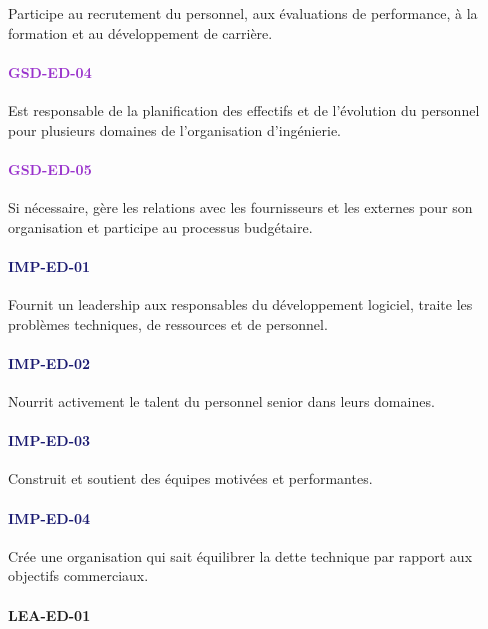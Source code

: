 \documentclass[a4paper, french, openany, 12pt]{book}
\newcommand\str[1]{\textcolor{DarkOrchid}{\textbf{\uppercase{gsd-{#1}}}}}
\newcommand\wis[1]{\textcolor{MidnightBlue}{\textbf{\uppercase{imp-{#1}}}}}
\newcommand\cha[1]{\textcolor{OliveGreen}{\textbf{\uppercase{lea-{#1}}}}}
\begin{document}
\begin{multicols}{2}
  Participe au recrutement du personnel, aux évaluations de performance, à la formation et au développement de carrière. 

  \paragraph*{\str{ed-04}}

  Est responsable de la planification des effectifs et de l'évolution du personnel pour plusieurs domaines de 
  l'organisation d'ingénierie.

  \paragraph*{\str{ed-05}}

  Si nécessaire, gère les relations avec les fournisseurs et les externes pour son organisation et participe au processus 
  budgétaire.

  \paragraph*{\wis{ed-01}}

  Fournit un leadership aux responsables du développement logiciel, traite les problèmes techniques, de ressources et de 
  personnel.

  \paragraph*{\wis{ed-02}}

  Nourrit activement le talent du personnel senior dans leurs domaines.

  \paragraph*{\wis{ed-03}}

  Construit et soutient des équipes motivées et performantes.

  \paragraph*{\wis{ed-04}}

  Crée une organisation qui sait équilibrer la dette technique par rapport aux objectifs commerciaux.

  \paragraph*{\cha{ed-01}}


\end{multicols}
\end{document}
